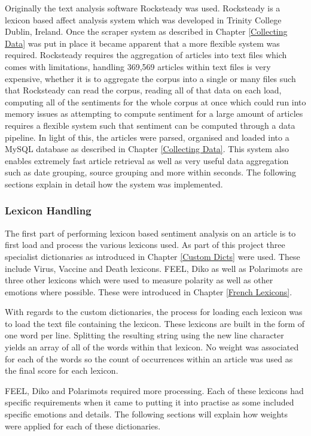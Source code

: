 Originally the text analysis software Rocksteady \cite{ahmad2014rocksteady} was used. Rocksteady is a lexicon based affect analysis system which was developed in Trinity College Dublin, Ireland. Once the scraper system as described in Chapter \ref{Collecting Data} was put in place it became apparent that a more flexible system was required. Rocksteady requires the aggregation of articles into text files which comes with limitations, handling 369,569 articles within text files is very expensive, whether it is to aggregate the corpus into a single or many files such that Rocksteady can read the corpus, reading all of that data on each load, computing all of the sentiments for the whole corpus at once which could run into memory issues as attempting to compute sentiment for a large amount of articles requires a flexible system such that sentiment can be computed through a data pipeline. In light of this, the articles were parsed, organised and loaded into a MySQL database as described in Chapter \ref{Collecting Data}. This system also enables extremely fast article retrieval as well as very useful data aggregation such as date grouping, source grouping and more within seconds. The following sections explain in detail how the system was implemented.
 
\subsubsection{Lexicon Handling}

The first part of performing lexicon based sentiment analysis on an article is to first load and process the various lexicons used. As part of this project three specialist dictionaries as introduced in Chapter \ref{Custom Dicts} were used. These include Virus, Vaccine and Death lexicons. FEEL, Diko as well as Polarimots are three other lexicons which were used to measure polarity as well as other emotions where possible. These were introduced in Chapter \ref{French Lexicons}.

With regards to the custom dictionaries, the process for loading each lexicon was to load the text file containing the lexicon. These lexicons are built in the form of one word per line. Splitting the resulting string using the new line character yields an array of all of the words within that lexicon. No weight was associated for each of the words so the count of occurrences within an article was used as the final score for each lexicon.

FEEL, Diko and Polarimots required more processing. Each of these lexicons had specific requirements when it came to putting it into practise as some included specific emotions and details. The following sections will explain how weights were applied for each of these dictionaries.

